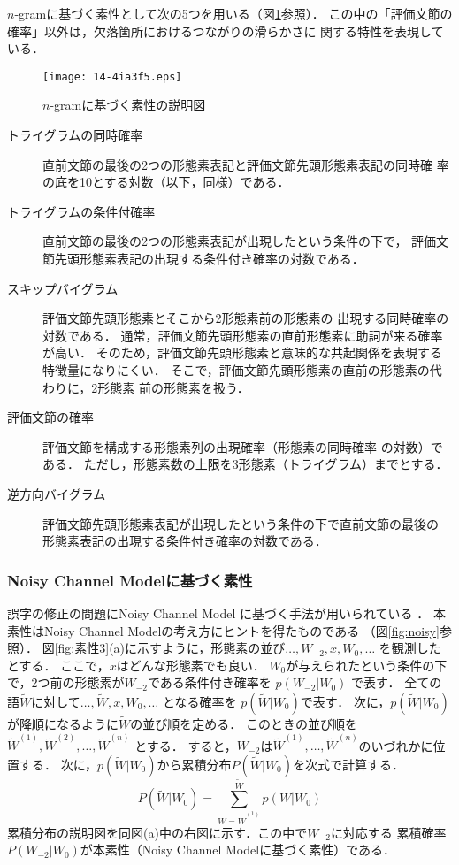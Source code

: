 \documentclass[japanese]{jnlp_1.3e}
\begin{document}
$n$-gramに基づく素性として次の5つを用いる（図\ref{fig:素性2}参照）．
この中の「評価文節の確率」以外は，欠落箇所におけるつながりの滑らかさに
関する特性を表現している．

\begin{figure}[b]
    \texttt{[image: 14-4ia3f5.eps]}
  \caption{$n$-gramに基づく素性の説明図}
  \label{fig:素性2}
\end{figure}

 \begin{description}
  \item [トライグラムの同時確率]
	      直前文節の最後の2つの形態素表記と評価文節先頭形態素表記の同時確
	      率の底を10とする対数（以下，同様）である．
  \item [トライグラムの条件付確率]
	      直前文節の最後の2つの形態素表記が出現したという条件の下で，
	      評価文節先頭形態素表記の出現する条件付き確率の対数である．
  \item [スキップバイグラム]
	      評価文節先頭形態素とそこから2形態素前の形態素の
	      出現する同時確率の対数である．
	      通常，評価文節先頭形態素の直前形態素に助詞が来る確率が高い．
	      そのため，評価文節先頭形態素と意味的な共起関係を表現する
	      特徴量になりにくい．
	      そこで，評価文節先頭形態素の直前の形態素の代わりに，2形態素
	      前の形態素を扱う．
  \item [評価文節の確率]
	      評価文節を構成する形態素列の出現確率（形態素の同時確率
	      の対数）である．
	      ただし，形態素数の上限を3形態素（トライグラム）までとする．
  \item [逆方向バイグラム] 
	      評価文節先頭形態素表記が出現したという条件の下で直前文節の最後の
	      形態素表記の出現する条件付き確率の対数である．
 \end{description}


\subsubsection{Noisy Channel Modelに基づく素性} 

誤字の修正の問題にNoisy Channel Model に基づく手法が用いられている
\cite{Kerninghan}．
本素性はNoisy Channel Modelの考え方にヒントを得たものである
（図\ref{fig:noisy}参照）．
図\ref{fig:素性3}(a)に示すように，形態素の並び$\ldots, W_{-2}, x, W_0, \ldots$
を観測したとする．
ここで，$x$はどんな形態素でも良い．
$W_0$が与えられたという条件の下で，2つ前の形態素が$W_{-2}$である条件付き確率を
$p(W_{-2} \vert W_0)$ で表す．
全ての語$\tilde W$に対して$\ldots, \tilde W, x, W_0, \ldots$ となる確率を
$p(\tilde W \vert W_0)$で表す．
次に，$p(\tilde W \vert W_0)$が降順になるように$\tilde W$の並び順を定める．
このときの並び順を
${\tilde W}^{(1)}, {\tilde W}^{(2)}, \ldots, {\tilde W}^{(n)}$
とする．
すると，$W_{-2}$は$\tilde W^{(1)}, \ldots, \tilde W^{(n)}$のいづれかに位置する．
次に，$p(\tilde W \vert W_0)$から累積分布$P(\tilde W \vert W_0)$を次式で計算する．
\begin{equation}
 P(\tilde W \vert W_0)=\sum_{W=\tilde W^{(1)}}^{\tilde W} p(W \vert W_0)
\end{equation}
累積分布の説明図を同図(a)中の右図に示す．この中で$W_{-2}$に対応する
累積確率$P(W_{-2} \vert W_0)$が本素性（Noisy Channel Modelに基づく素性）である．
\end{document}
